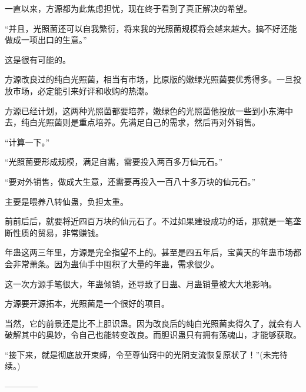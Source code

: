 \begin{this_body}
一直以来，方源都为此焦虑担忧，现在终于看到了真正解决的希望。

“并且，光照菌还可以自我繁衍，将来我的光照菌规模将会越来越大。搞不好还能做成一项出口的生意。”

这是很有可能的。

方源改良过的纯白光照菌，相当有市场，比原版的嫩绿光照菌要优秀得多。一旦投放市场，必定能引来好评和收购的热潮。

方源已经计划，这两种光照菌都要培养，嫩绿色的光照菌他投放一些到小东海中去，纯白光照菌则是重点培养。先满足自己的需求，然后再对外销售。

“计算一下。”

“光照菌要形成规模，满足自需，需要投入两百多万仙元石。”

“要对外销售，做成大生意，还需要再投入一百八十多万块的仙元石。”

主要是喂养八转仙蛊，负担太重。

前前后后，就要将近四百万块的仙元石了。不过如果建设成功的话，那就是一笔垄断性质的贸易，非常赚钱。

年蛊这两三年里，方源是完全指望不上的。甚至是四五年后，宝黄天的年蛊市场都会非常萧条。因为蛊仙手中囤积了大量的年蛊，需求很少。

这一次方源手笔很大，年蛊倾销，还导致了日蛊、月蛊销量被大大地影响。

方源要开源拓本，光照菌是一个很好的项目。

当然，它的前景还是比不上胆识蛊。因为改良后的纯白光照菌卖得久了，就会有人破解其中的奥妙，令自己也能转变改良。而胆识蛊只有拥有荡魂山，才能够获取。

“接下来，就是彻底放开束缚，令至尊仙窍中的光阴支流恢复原状了！”(未完待续。)

------------

\end{this_body}

